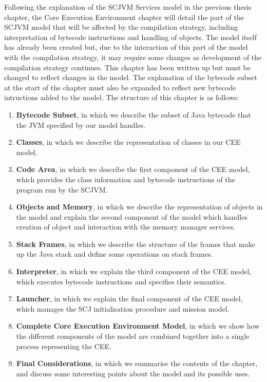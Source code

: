\documentclass[a4paper,10pt]{report}
\let\olditem\item
\renewcommand{\item}[1][]{\olditem{\bfseries #1}}
\begin{document}
Following the explanation of the SCJVM Services model in the previous
thesis chapter, the Core Execution Environment chapter will detail the
part of the SCJVM model that will be affected by the compilation
strategy, including interpretation of bytecode instructions and
handling of objects.
The model itself has already been created but, due to the interaction
of this part of the model with the compilation strategy, it may
require some changes as development of the compilation strategy
continues.
This chapter has been written up but must be changed to reflect
changes in the model.
The explanation of the bytecode subset at the start of the chapter
must also be expanded to reflect new bytecode intructions added to the
model.
The structure of this chapter is as follows:
\begin{enumerate}
\item[Bytecode Subset], in which we describe the subset of Java
  bytecode that the JVM specified by our model handles.
\item[Classes], in which we describe the representation of classes in
  our CEE model.
\item[Code Area], in which we describe the first component of the CEE
  model, which provides the class information and bytecode
  instructions of the program run by the SCJVM.
\item[Objects and Memory], in which we describe the representation of
  objects in the model and explain the second component of the model
  which handles creation of object and interaction with the memory
  manager services.
\item[Stack Frames], in which we describe the structure of the frames
  that make up the Java stack and define some operations on stack
  frames.
\item[Interpreter], in which we explain the third component of the CEE
  model, which executes bytecode instructions and specifies their
  semantics.
\item[Launcher], in which we explain the final component of the CEE
  model, which manages the SCJ initialisation procedure and mission
  model.
\item[Complete Core Execution Environment Model], in which we show how
  the different components of the model are combined together into a
  single process representing the CEE.
\item[Final Considerations], in which we summarise the contents of the
  chapter, and discuss some interesting points about the model and its
  possible uses.
\end{enumerate}
\end{document}
